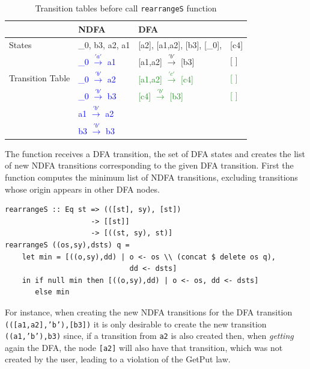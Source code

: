 \begin{table}
  \begin{center}
    \begin{tabular}{ | p{3cm} |p{4cm}||p{3cm} p{1cm} |  }
    \hline
         & NDFA & DFA & \\ [1ex]
        \hline
        States & \_0, b3, a2, a1 & [a2], [a1,a2], [b3], [\_0], & [c4]\\ [0.7ex]
        \hline
        \multirow{3}{5em}{Transition Table} & \textcolor{blue}{\_0 $\xrightarrow{'a'}$ a1} & [a1,a2]  $\xrightarrow{'b'}$ [b3] & [ ]\\
        & \textcolor{blue}{\_0 $\xrightarrow{'b'}$ a2} & \textcolor{ForestGreen}{[a1,a2]  $\xrightarrow{'c'}$ [c4]} & \textcolor{ForestGreen}{[ ]}\\
        & \textcolor{blue}{\_0 $\xrightarrow{'b'}$ b3} & \textcolor{ForestGreen}{[c4]  $\xrightarrow{'b'}$ [b3]} & \textcolor{ForestGreen}{[ ]}\\
        & \textcolor{blue}{a1  $\xrightarrow{'b'}$ a2} & & \\
        & \textcolor{blue}{b3  $\xrightarrow{'b'}$ b3} & & \\
        \hline
        \end{tabular}
  \end{center}
  \caption{Transition tables before call \texttt{rearrangeS} function}
  \label{getTable3}
\end{table}

The function receives a DFA transition, the set of DFA states and creates the list of new NDFA transitions corresponding to the given DFA transition. 
First the function computes the minimum list of NDFA transitions, excluding transitions whose origin appears in other DFA nodes. 

\begin{verbatim}
rearrangeS :: Eq st => (([st], sy), [st])
                    -> [[st]] 
                    -> [((st, sy), st)]
rearrangeS ((os,sy),dsts) q = 
    let min = [((o,sy),dd) | o <- os \\ (concat $ delete os q), 
                             dd <- dsts]
    in if null min then [((o,sy),dd) | o <- os, dd <- dsts]
       else min 
\end{verbatim}

For instance, when creating the new NDFA transitions for the DFA transition \texttt{(([a1,a2],'b'),[b3])} it is only desirable to create the new transition \texttt{((a1,'b'),b3)} since, if a transition from \texttt{a2} is also created then, when \textit{getting} again the DFA, the node \texttt{[a2]} will also have that transition, which was not created by the user, leading to a violation of the GetPut law. 

